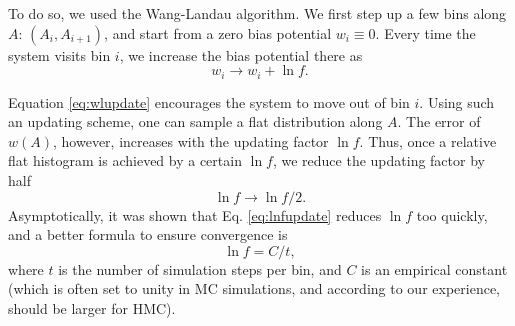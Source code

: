 \documentclass[notitlepage, preprint,superscriptaddress]{revtex4-1}
\begin{document}
To do so, we used the Wang-Landau algorithm\cite{
wang2001, wang2001pre}.
%
We first step up a few bins along $A$:
$(A_i, A_{i+1})$,
and start from a zero bias potential
$w_i \equiv 0$.
%
Every time the system visits bin $i$,
we increase the bias potential there as\cite{
wang2001, wang2001pre}
%
\begin{equation}
w_i \rightarrow w_i + \ln f.
\label{eq:wlupdate}
\end{equation}



Equation \eqref{eq:wlupdate} encourages
the system to move out of bin $i$.
%
Using such an updating scheme,
one can sample a flat distribution along $A$.
%
The error of $w(A)$, however, increases with
the updating factor $\ln f$.
%
Thus, once a relative flat histogram is achieved
by a certain $\ln f$, we reduce the updating factor
by half\cite{
wang2001, wang2001pre}
%
\begin{equation}
  \ln f \rightarrow \ln f / 2.
\label{eq:lnfupdate}
\end{equation}
%
Asymptotically, it was shown that
Eq. \eqref{eq:lnfupdate} reduces $\ln f$ too quickly,
and a better formula to ensure convergence is\cite{
belardinelli2007, *belardinelli2008}
\begin{equation}
  \ln f = C / t,
\end{equation}
where $t$ is the number of simulation steps per bin,
and $C$ is an empirical constant
(which is often set to unity in MC simulations,
and according to our experience, should be larger for HMC).




\end{document}
